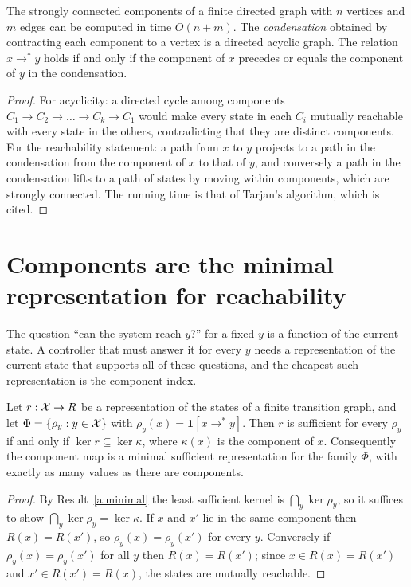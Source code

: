 \begin{established}\label{thm:tarjan}
The strongly connected components of a finite directed graph with $n$ vertices and $m$ edges can be computed in time $O(n+m)$. The \emph{condensation} obtained by contracting each component to a vertex is a directed acyclic graph. The relation $x\to^{*}y$ holds if and only if the component of $x$ precedes or equals the component of $y$ in the condensation.
\end{established}
\begin{proof}
For acyclicity: a directed cycle among components $C_1\to C_2\to\dots\to C_k\to C_1$ would make every state in each $C_i$ mutually reachable with every state in the others, contradicting that they are distinct components. For the reachability statement: a path from $x$ to $y$ projects to a path in the condensation from the component of $x$ to that of $y$, and conversely a path in the condensation lifts to a path of states by moving within components, which are strongly connected. The running time is that of Tarjan's algorithm, which is cited.
\end{proof}

\section{Components are the minimal representation for reachability}

The question ``can the system reach $y$?'' for a fixed $y$ is a function of the current state. A controller that must answer it for every $y$ needs a representation of the current state that supports all of these questions, and the cheapest such representation is the component index.

\begin{newresult}\label{thm:scc-minimal}
Let $r:\mathcal{X}\to R$ be a representation of the states of a finite transition graph, and let $\Phi=\{\rho_y:y\in\mathcal{X}\}$ with $\rho_y(x)=\mathbf 1[x\to^{*}y]$. Then $r$ is sufficient for every $\rho_y$ if and only if $\ker r\subseteq\ker\kappa$, where $\kappa(x)$ is the component of $x$. Consequently the component map is a minimal sufficient representation for the family $\Phi$, with exactly as many values as there are components.
\end{newresult}
\begin{proof}
By Result~\ref{a:minimal} the least sufficient kernel is $\bigcap_y\ker\rho_y$, so it suffices to show $\bigcap_y\ker\rho_y=\ker\kappa$. If $x$ and $x'$ lie in the same component then $R(x)=R(x')$, so $\rho_y(x)=\rho_y(x')$ for every $y$. Conversely if $\rho_y(x)=\rho_y(x')$ for all $y$ then $R(x)=R(x')$; since $x\in R(x)=R(x')$ and $x'\in R(x')=R(x)$, the states are mutually reachable.
\end{proof}

